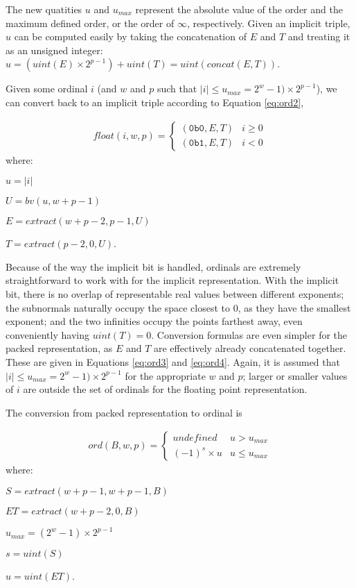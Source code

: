 \documentclass[letterpaper,10pt]{article}
\begin{document}
The new quatities $u$ and $u_{max}$ represent the absolute value of the order and the maximum defined order, or the order of $\infty$, respectively. Given an implicit triple, $u$ can be computed easily by taking the concatenation of $E$ and $T$ and treating it as an unsigned integer: $u = (uint(E) \times 2^{p-1}) + uint(T) = uint(concat(E,T))$.

Given some ordinal $i$ (and $w$ and $p$ such that $\lvert i \rvert \leq u_{max} = 2^w-1) \times 2^{p-1}$), we can convert back to an implicit triple according to Equation \ref{eq:ord2},

\begin{align} \label{eq:ord2}
 float(i, w, p) = 
 \begin{cases}
  (\texttt{0b0}, E, T) & i \geq 0 \\
  (\texttt{0b1}, E, T) & i < 0
 \end{cases}
\end{align}
where:
\begin{description}
 \item $u = \lvert i \rvert$
 \item $U = bv(u, w + p - 1)$
 \item $E = extract(w + p - 2, p - 1, U)$
 \item $T = extract(p - 2, 0, U)$.
\end{description}

Because of the way the implicit bit is handled, ordinals are extremely straightforward to work with for the implicit representation. With the implicit bit, there is no overlap of representable real values between different exponents; the subnormals naturally occupy the space closest to 0, as they have the smallest exponent; and the two infinities occupy the points farthest away, even conveniently having $uint(T) = 0$. Conversion formulas are even simpler for the packed representation, as $E$ and $T$ are effectively already concatenated together. These are given in Equations \ref{eq:ord3} and \ref{eq:ord4}. Again, it is assumed that $\lvert i \rvert \leq u_{max} = 2^w-1) \times 2^{p-1}$ for the appropriate $w$ and $p$; larger or smaller values of $i$ are outside the set of ordinals for the floating point representation.

The conversion from packed representation to ordinal is

\begin{align} \label{eq:ord3}
 ord(B, w, p) = 
 \begin{cases}
  undefined       & u > u_{max}\\
  (-1)^s \times u & u \leq u_{max}
 \end{cases}
\end{align}
where:
\begin{description}
 \item $S = extract(w + p - 1, w + p - 1, B)$
 \item $ET = extract(w + p - 2, 0, B)$
 \item $u_{max} = (2^w-1) \times 2^{p-1}$
 \item $s = uint(S)$
 \item $u = uint(ET)$.
\end{description}
\end{document}
